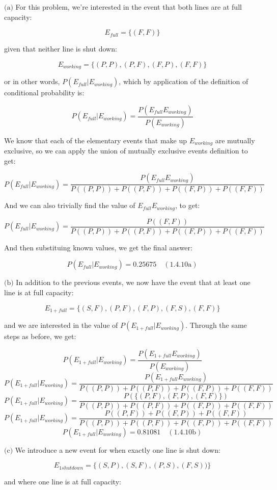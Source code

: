 \documentclass{article}
\newcommand{\subproblem}[3]{$\boxed{\text{(#3)}}$}
\newcommand{\subsolution}[4]{\boxed{#4\quad(\text{#1.#2#3})}}
\begin{document}
%
\subproblem{1.4}{10}{a} For this problem, we're interested in the event that
both lines are at full capacity:

\[
E_{full}=\{(F,F)\}
\]

given that neither line is shut down:

\[
E_{working}=\{(P,P),(P,F),(F,P),(F,F)\}
\]

or in other words, $P(E_{full}|E_{working})$, which by application of
the definition of conditional probability is:

\[
P(E_{full}|E_{working})=
\dfrac{P(E_{full}E_{working})}{P(E_{working})}
\]

We know that each of the elementary events that make up $E_{working}$
are mutually exclusive, so we can apply the union of mutually
exclusive events definition to get:

\[
P(E_{full}|E_{working})=
\dfrac{P(E_{full}E_{working})}{P((P,P))+P((P,F))+P((F,P))+P((F,F))}
\]

And we can also trivially find the value of $E_{full}E_{working}$, to get:

\[
P(E_{full}|E_{working})=
\dfrac{P((F,F))}{P((P,P))+P((P,F))+P((F,P))+P((F,F))}
\]

And then substituing known values, we get the final answer:

\[
\subsolution{1.4}{10}{a}{P(E_{full}|E_{working})=0.25675}
\]

%
\subproblem{1.4}{10}{b} In addition to the previous events, we now
have the event that at least one line is at full capacity:

\[
E_{1+ full}=\{(S,F),(P,F),(F,P),(F,S),(F,F)\}
\]

and we are interested in the value of $P(E_{1+ full}|E_{working})$.
Through the same steps as before, we get:

\[
P(E_{1+ full}|E_{working})=
\dfrac{P(E_{1+full}E_{working})}{P(E_{working})}
\] \[
P(E_{1+full}|E_{working})=
\dfrac{P(E_{1+full}E_{working})}{P((P,P))+P((P,F))+P((F,P))+P((F,F))}
\] \[
P(E_{1+full}|E_{working})=
\dfrac{P(\{(P,F),(F,P),(F,F)\})}
{P((P,P))+P((P,F))+P((F,P))+P((F,F))}
\] \[
P(E_{1+full}|E_{working})=
\dfrac{P((P,F))+P((F,P))+P((F,F))}
{P((P,P))+P((P,F))+P((F,P))+P((F,F))}
\] \[
\subsolution{1.4}{10}{b}{P(E_{1+full}|E_{working})=0.81081}
\]

%
\subproblem{1.4}{10}{c} We introduce a new event for when exactly one
line is shut down:

\[
E_{1shutdown} = \{(S,P),(S,F),(P,S),(F,S))\}
\]

and where one line is at full capacity:
\end{document}
